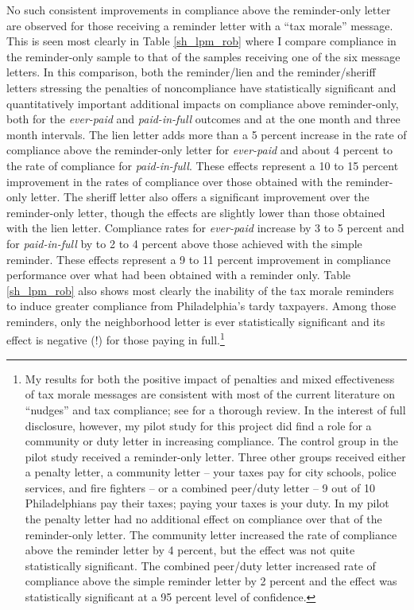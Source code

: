 No such consistent improvements in compliance above the reminder-only letter are observed for those
receiving a reminder letter with a ``tax morale'' message.  This is
seen most clearly in Table \ref{sh_lpm_rob} where I compare
compliance in the reminder-only sample to that of the samples
receiving one of the six message letters. In this comparison, both the
reminder/lien and the reminder/sheriff letters stressing the penalties
of noncompliance have statistically significant
and quantitatively important additional impacts on compliance above reminder-only, both
for the \textit{ever-paid} and \textit{paid-in-full} outcomes and at
the one month and three month intervals. The lien letter adds more
than a 5 percent increase in the rate of compliance above the reminder-only
letter for \textit{ever-paid} and about 4 percent to the rate of
compliance for \textit{paid-in-full}. These effects represent a 10 to
15 percent improvement in the rates of compliance over those obtained
with the reminder-only letter.  The sheriff letter also offers a
significant improvement over the reminder-only letter, though the
effects are slightly lower than those obtained with the lien letter.
Compliance rates for \textit{ever-paid} increase by 3 to 5 percent and
for \textit{paid-in-full} by to 2 to 4 percent above those achieved
with the simple reminder.  These effects represent a 9 to 11 percent
improvement in compliance performance over what had been obtained with
a reminder only. Table \ref{sh_lpm_rob} also shows most clearly the
inability of the tax morale reminders to induce greater compliance
from Philadelphia's tardy taxpayers.  Among those reminders, only the
neighborhood letter is ever statistically significant and its effect
is negative (!) for those paying in full.\footnote{\label{fn:nudges}My results for
  both the positive impact of penalties and mixed effectiveness of tax
  morale messages are consistent with most of the current literature
  on ``nudges'' and tax compliance; see \cite{Hallsworthb-14} for a
  thorough review. In the interest of full disclosure, however, my
  pilot study \cite{CILMS-16} for this project did find a role for a
  community or duty letter in increasing compliance.  The control
  group in the pilot study received a reminder-only letter.  Three
  other groups received either a penalty letter, a community letter --
  your taxes pay for city schools, police services, and fire fighters
  -- or a combined peer/duty letter -- 9 out of 10 Philadelphians pay
  their taxes; paying your taxes is your duty. In my pilot the
  penalty letter had no additional effect on compliance over that of
  the reminder-only letter.  The community letter increased the rate
  of compliance above the reminder letter by 4 percent, but the effect
  was not quite statistically significant.  The combined peer/duty
  letter increased rate of compliance above the simple reminder letter
  by 2 percent and the effect was statistically significant at a 95
  percent level of confidence.}

